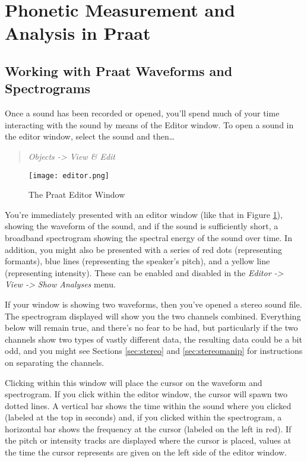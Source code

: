 \hypertarget{phonetic-measurement-and-analysis-in-praat}{%
\section{Phonetic Measurement and Analysis in
Praat}\label{phonetic-measurement-and-analysis-in-praat}}

\hypertarget{working-with-praat-waveforms-and-spectrograms}{%
\subsection{Working with Praat Waveforms and
Spectrograms}\label{working-with-praat-waveforms-and-spectrograms}}

Once a sound has been recorded or opened, you'll spend much of your time
interacting with the sound by means of the Editor window. To open a
sound in the editor window, select the sound and then\ldots{}

\begin{quote}
\emph{Objects -\textgreater{} View \& Edit}
\end{quote}

\begin{figure}
  \centerline{
    \mbox{\texttt{[image: editor.png]}}
  }
  \caption{The Praat Editor Window \label{editor}}

  \end{figure}

You're immediately presented with an editor window (like that in Figure
\ref{editor}), showing the waveform of the sound, and if the sound is
sufficiently short, a broadband spectrogram showing the spectral energy
of the sound over time. In addition, you might also be presented with a
series of red dots (representing formants), blue lines (representing the
speaker's pitch), and a yellow line (representing intensity). These can
be enabled and disabled in the \emph{Editor -\textgreater{} View
-\textgreater{} Show Analyses} menu.

If your window is showing two waveforms, then you've opened a stereo
sound file. The spectrogram displayed will show you the two channels
combined. Everything below will remain true, and there's no fear to be
had, but particularly if the two channels show two types of vastly
different data, the resulting data could be a bit odd, and you might see
Sections \ref{sec:stereo} and \ref{sec:stereomanip} for instructions on
separating the channels.

Clicking within this window will place the cursor on the waveform and
spectrogram. If you click within the editor window, the cursor will
spawn two dotted lines. A vertical bar shows the time within the sound
where you clicked (labeled at the top in seconds) and, if you clicked
within the spectrogram, a horizontal bar shows the frequency at the
cursor (labeled on the left in red). If the pitch or intensity tracks
are displayed where the cursor is placed, values at the time the cursor
represents are given on the left side of the editor window.

